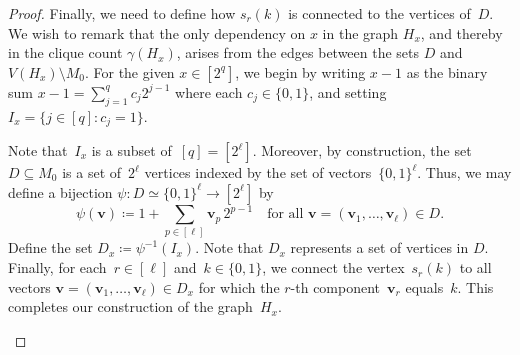 \documentclass[11pt, final]{article}
\theoremstyle{definition}
\newcommand{\vv}{\textbf{v}}
\begin{document}
\begin{proof}
Finally, we need to define how $s_r(k)$ is connected to the vertices of~$D$. We wish to remark that the only dependency on $x$ in the graph $H_x$, and thereby in the clique count $\gamma(H_x)$, arises from the edges between the sets $D$ and $V(H_x)\setminus M_0$. For the given $x \in [2^{q}]$, we begin by writing $x-1$ as the binary sum $x - 1 = \sum_{j=1}^{q} c_j2^{j-1}$ where each $c_j\in \{0,1\}$, and setting $I_x=\{j\in[q]:c_{j}=1\}$. 

Note that~$I_x$ is a subset of~$[q] = [2^{\ell}]$. Moreover, by construction, the set~$D \subseteq M_0$ is a set of~$2^\ell$ vertices indexed by the set of vectors~$\{0,1\}^{\ell}$. Thus, we may define a bijection $\psi : D \simeq \{0,1\}^\ell \to [2^\ell]$ by $$\psi(\vv)\coloneqq1+\sum_{p\in[\ell]} \vv_{p}\, 2^{p-1} \quad \text{for all $\vv = (\vv_1, \ldots, \vv_{\ell}) \in D$.}$$ 
Define the set $D_x \coloneqq \psi^{-1}(I_x)$. Note that $D_x$ represents a set of vertices in $D$. Finally, for each~$r \in [\ell]$ and~$k \in \{0,1\}$, we connect the vertex~$s_r(k)$ to all vectors $\vv = (\vv_1, \ldots, \vv_\ell) \in D_x$ for which the $r$-th component~$\vv_r$ equals~$k$. This completes our construction of the graph~$H_x$. 

\begin{figure}[btp]
  \begin{subfigure}{0.47\textwidth}
  \centering
\end{subfigure}
\end{figure}
\end{proof}
\end{document}
